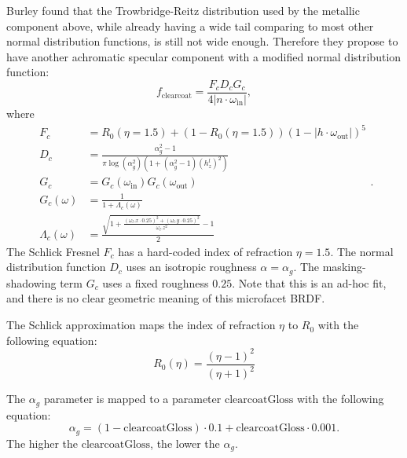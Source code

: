 Burley found that the Trowbridge-Reitz distribution used by the metallic component above, while already having a wide tail comparing to most other normal distribution functions, is still not wide enough. Therefore they propose to have another achromatic specular component with a modified normal distribution function:
\begin{equation}
f_{\text{clearcoat}} = \frac{F_c D_c G_c}{4 |n \cdot \omega_{\text{in}}|},
\label{eq:f_clearcoat}
\end{equation}
where
\begin{equation}
\begin{aligned}
F_c &= R_0(\eta = 1.5) + (1 - R_0(\eta = 1.5)) \left(1 - |h \cdot \omega_{\text{out}}|\right)^5 \\
D_c &= \frac{\alpha_g^2 - 1}{\pi \log(\alpha_g^2) \left( 1 + (\alpha_g^2 - 1) \left(h^l_z\right)^2 \right)} \\
G_c &= G_{c}(\omega_{\text{in}}) G_{c}(\omega_{\text{out}}) \\
G_{c}(\omega) &= \frac{1}{1 + \Lambda_c(\omega)} \\
\Lambda_c(\omega) &= \frac{\sqrt{1 + \frac{\left(\omega_l.x \cdot 0.25\right)^2 + \left(\omega_l.y \cdot 0.25\right)^2}{\omega_l.z^2}} - 1}{2}
\end{aligned}.
\end{equation}
The Schlick Fresnel $F_c$ has a hard-coded index of refraction $\eta = 1.5$. The normal distribution function $D_c$ uses an isotropic roughness $\alpha = \alpha_g$. The masking-shadowing term $G_c$ uses a fixed roughness $0.25$. Note that this is an ad-hoc fit, and there is no clear geometric meaning of this microfacet BRDF.

The Schlick approximation maps the index of refraction $\eta$ to $R_0$ with the following equation:
\begin{equation}
R_0(\eta) = \frac{\left(\eta - 1\right)^2}{\left(\eta + 1\right)^2}
\end{equation}

The $\alpha_g$ parameter is mapped to a parameter $\text{clearcoatGloss}$ with the following equation:
\begin{equation}
\alpha_g = (1 - \text{clearcoatGloss}) \cdot 0.1 + \text{clearcoatGloss} \cdot 0.001.
\end{equation}
The higher the $\text{clearcoatGloss}$, the lower the $\alpha_g$.

